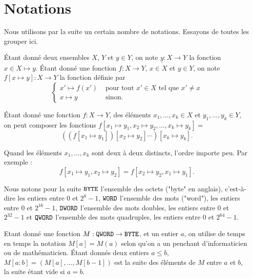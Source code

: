 \documentclass{book}
\newenvironment{formalisme}[1]{%
	\def\FrameCommand{\fboxrule=\FrameRule\fboxsep=\FrameSep \fcolorbox{red!10}{red!5}}%
	\MakeFramed {\advance\hsize-\width \FrameRestore}
	\noindent {\bf #1}\\
}%
{\endMakeFramed}
\newcommand{\BYTE}{{\tt BYTE}}
\newcommand{\WORD}{{\tt WORD}}
\newcommand{\DWORD}{{\tt DWORD}}
\newcommand{\QWORD}{{\tt QWORD}}
\begin{document}
\section{Notations} \label{sec:notations}

Nous utilisons par la suite un certain nombre de notations. Essayons de toutes les grouper ici.


\'Etant donné deux ensembles $X$, $Y$ et $y \in Y$, on note $\underline{y} : X \to Y$ la fonction $x \in X \mapsto y$. \'Etant donné une fonction $f : X \to Y$, $x \in X$ et $y \in Y$, on note $f[x \mapsto y] : X\to Y $ la fonction définie par
$$\left\{
\begin{array}{ll}
x' \mapsto f(x') & \text{ pour tout } x' \in X \text{ tel que }x' \neq x\\
x \mapsto y & \text{ sinon}.
\end{array}\right.$$

\'Etant donné une fonction $f : X \to Y$, des éléments $x_1, \ldots, x_k \in X$ et $y_1,\ldots, y_k \in Y$, 
on peut composer les fonctions $f[x_1 \mapsto y_1, x_2 \mapsto y_2, \ldots, x_k \mapsto y_k] = $
$$\left( (f[x_1 \mapsto y_1])[x_2 \mapsto y_2]\cdots\right)[x_k\mapsto y_k].$$ 

Quand les éléments $x_1, \ldots, x_k$ sont deux à deux distincts, l'ordre importe peu. Par exemple : 
$$f[x_1\mapsto y_1, x_2 \mapsto y_2] = f[x_2\mapsto y_2, x_1 \mapsto y_1].$$

Nous notons pour la suite $\BYTE$ l'ensemble des octets ("byte" en anglais), c'est-à-dire les entiers entre $0$ et $2^8 -1$, $\WORD$ l'ensemble des mots ("word"), les entiers entre $0$ et $2^{16} - 1$,  $\DWORD$ l'ensemble des mots doubles, les entiers entre $0$ et $2^{32} -1$ et  $\QWORD$ l'ensemble des mots quadruples, les entiers entre $0$ et $2^{64} - 1$.

Etant donné une fonction $M: \QWORD \to \BYTE$, et un entier $a$, on utilise de temps en temps la notation $M[a] = M(a)$ selon qu'on a un penchant d'informaticien ou de mathématicien. \'Etant donnés deux entiers $a \leq b$, $M[a:b] = (M[a], \ldots, M[b-1])$ est la suite des éléments de $M$ entre $a$ et $b$, la suite étant vide si $a=b$. 
\end{document}
